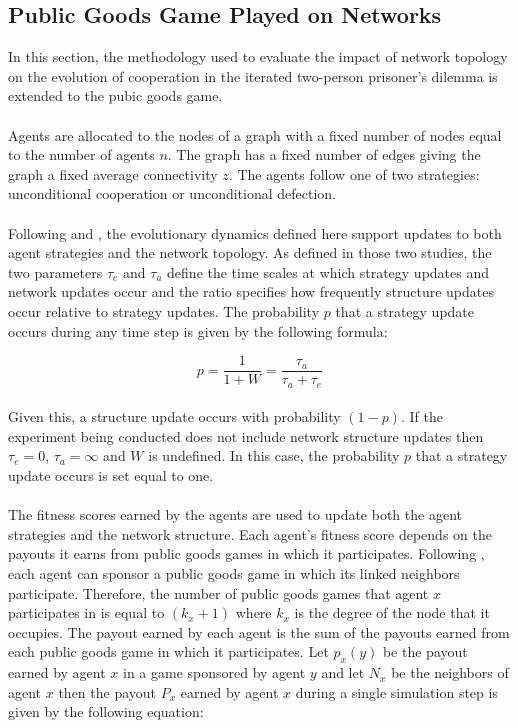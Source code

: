 \documentclass{article}
\begin{document}
	\subsection{Public Goods Game Played on Networks}
	In this section, the methodology used to evaluate the impact of network topology on the evolution of cooperation in the iterated two-person prisoner's dilemma is extended to the pubic goods game.
	\paragraph{}Agents are allocated to the nodes of a graph with a fixed number of nodes equal to the number of agents $n$.  The graph has a fixed number of edges giving the graph a fixed average connectivity $z$.  The agents follow one of two strategies: unconditional cooperation or unconditional defection.
	\paragraph{}Following \cite{Santos2006d} and \cite{Fu2008}, the evolutionary dynamics defined here support updates to both agent strategies and the network topology.  As defined in those two studies, the two parameters $\tau_e$ and $\tau_a$ define the time scales at which strategy updates and network updates occur and the ratio  specifies how frequently structure updates occur relative to strategy updates.  The probability $p$ that a strategy update occurs during any time step is given by the following formula:

	\begin{equation}
	p=\frac{1}{1+W}=\frac{\tau_a}{\tau_a+\tau_e}	
	\end{equation}

	\paragraph{}Given this, a structure update occurs with probability $(1-p)$.  If the experiment being conducted does not include network structure updates then $\tau_e=0$, $\tau_a=\infty$ and $W$ is undefined.  In this case, the probability $p$ that a strategy update occurs is set equal to one.
	\paragraph{}The fitness scores earned by the agents are used to update both the agent strategies and the network structure.  Each agent's fitness score depends on the payouts it earns from public goods games in which it participates.  Following \cite{Li2014}, each agent can sponsor a public goods game in which its linked neighbors participate.  Therefore, the number of public goods games that agent $x$ participates in is equal to $(k_x+1)$ where $k_x$ is the degree of the node that it occupies.  The payout earned by each agent is the sum of the payouts earned from each public goods game in which it participates.  Let $p_x(y)$ be the payout earned by agent $x$ in a game sponsored by agent $y$ and let $N_x$ be the neighbors of agent $x$ then the payout $P_x$ earned by agent $x$ during a single simulation step is given by the following equation:
\end{document}
